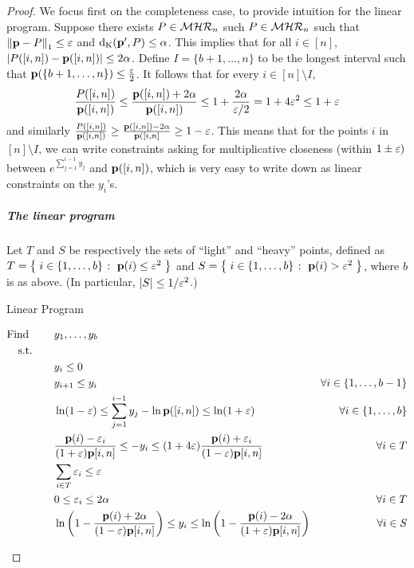 \begin{proof}
We focus first on the completeness case, to provide intuition for the linear program. Suppose there exists $P\in\mathcal{MHR}_{n}$ such $P\in\mathcal{MHR}_{n}$ such that ${\lVert\mathbf{p}-P{\rVert}}_1 \leq \varepsilon$  and ${\operatorname{d_{\textrm{K}}}\!\left({\mathbf{p}^\prime, P}\right)} \leq \alpha$. This implies that for all $i\in[n]$, $\left\lvert  P([i,n]) - \mathbf{p}([i,n])  \right\rvert \leq 2\alpha$. Define $I=\{b+1,\dots,n\}$ to be the longest interval such that $\mathbf{p}(\{b+1,\dots,n\})\leq \frac{\varepsilon}{2}$. It follows that for every $i\in [n]\setminus I$,
\begin{equation}\label{eq:mhr:mult:approx:cdf}
    \frac{P([i,n])}{\mathbf{p}([i,n])} \leq \frac{\mathbf{p}([i,n])+2\alpha}{\mathbf{p}([i,n])} \leq 1+\frac{2\alpha}{\varepsilon/2} = 1+4\varepsilon^2 \leq 1+\varepsilon
\end{equation}
and similarly
$
    \frac{P([i,n])}{\mathbf{p}([i,n])} \geq \frac{\mathbf{p}([i,n])-2\alpha}{\mathbf{p}([i,n]} \geq 1-\varepsilon
$.
This means that for the points $i$ in $[n]\setminus I$, we can write constraints asking for multiplicative closeness (within $1\pm \varepsilon)$ between $e^{\sum_{j=1}^{i-1} y_j}$ and $\mathbf{p}([i,n])$, which is very easy to write down as linear constraints on the $y_i$'s.

\subparagraph{The linear program} 
Let $T$ and $S$ be respectively the sets of ``light'' and ``heavy'' points, defined as $T=\left\{\;  i\in \{1,\dots,b\}  \;\colon\;  \mathbf{p}(i) \leq \varepsilon^2 \; \right\}$ and  $S=\left\{\;  i\in \{1,\dots,b\}  \;\colon\;  \mathbf{p}(i) > \varepsilon^2 \; \right\}$, where $b$ is as above. (In particular, $\left\lvert S \right\rvert \leq 1/\varepsilon^2$.)

\begin{algorithm}
\caption{\label{algo:lp:mhr}Linear Program}
  \begin{align}
  \text{Find }\qquad  & y_1,\dots,y_b & \notag\\
  \text{s.t.}\qquad & \hfill& \notag\\
   &y_i \leq 0 &     \label{lp:mhr:01}\\
   & y_{i+1} \leq y_{i} & \forall i \in \{1,\dots,b-1\}     \label{lp:mhr}\\
   & \ln\!\left(1-\eps\right)  \leq \sum_{j=1}^{i-1} y_{j} - \ln \D([i,n]) \leq  \ln\!\left(1+\eps\right) & \forall i \in \{1,\dots,b\}     \label{lp:mhr:mult:close}\\
   &\frac{\D(i)-\eps_i}{(1+\eps)\D[i,n]} \leq -y_i \leq (1+4\eps)\frac{\D(i)+\eps_i}{(1-\eps)\D[i,n]}      & \forall i\in T  \label{lp:mhr:bound:yi}\\
    &\sum_{i\in T} \eps_i \leq \eps \label{lp:mhr:bound:sum:epsi}\\
    & 0 \leq \eps_i \leq 2\alpha & \forall i\in T \label{lp:mhr:noneg:epsi}\\
    & \ln\left( 1-\frac{\D(i)+2\alpha}{(1-\eps)\D[i,n]} \right) \leq y_i \leq \ln\left( 1-\frac{\D(i)-2\alpha}{(1+\eps)\D[i,n]} \right) & \forall i\in S \label{lp:mhr:heavypoints}
  \end{align}
\end{algorithm}


\end{proof}
